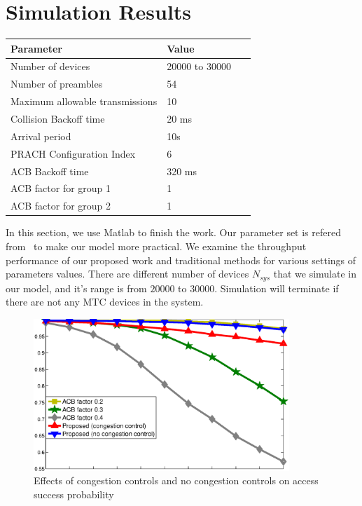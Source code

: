 \section{Simulation Results}
\label{simulation}
    \begin{table}[ht]
    \label{parameter set}
    \center
    \begin{tabular}{|l|l|l|}
    \hline
    Parameter                       & Value  &                                       \\ \hline
    Number of devices               &20000 to 30000  & \multirow{6}{*}{~\cite{3GPP37.868}}   \\ \cline{1-2}
    Number of preambles             & 54     &                                       \\ \cline{1-2}
    Maximum allowable transmissions & 10     &                                       \\ \cline{1-2}
    Collision Backoff time          & 20 ms  &                                       \\ \cline{1-2}
    Arrival period                  & 10s    &                                       \\ \cline{1-2}
    PRACH Configuration Index       & 6      &                                       \\ \hline
    ACB Backoff time                & 320 ms &                                       \\ \hline
    ACB factor for group 1          & 1      &                                       \\ \hline
    ACB factor for group 2          & 1      &                                       \\ \hline
    \end{tabular}
    \end{table}

    In this section, we use Matlab to finish the work. Our parameter set is refered from~\cite{3GPP37.868} to make our model more practical. We examine the throughput performance of our proposed work and traditional methods for various settings of parameters values. There are different number of devices $N_{sys}$ that we simulate in our model, and it's range is from $20000$ to $30000$. Simulation will terminate if there are not any MTC devices in the system.
    \begin{figure}[t]
    \centering
    \includegraphics[width=3.8in]{combine_suc.eps}
    \caption{Effects of congestion controls and no congestion controls on access success probability}
    \label{fig_suc_proposed_ACB}
    \end{figure}

